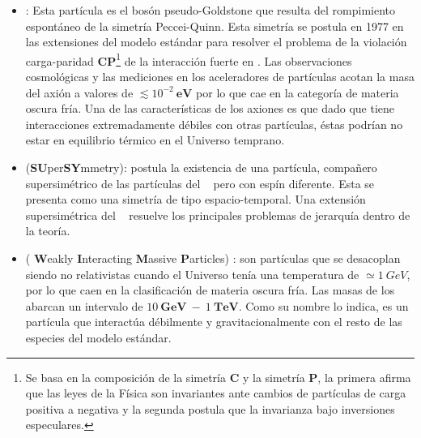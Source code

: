 \begin{itemize}
\item \textbf{\Axiones}%
: Esta partícula es el bosón pseudo-Goldstone que resulta del rompimiento espontáneo de la simetría Peccei-Quinn. Esta simetría se postula en 1977 en las extensiones del modelo estándar para resolver el problema de la violación carga-paridad \textbf{CP}\footnote{Se basa en la composición de la simetría \textbf{C} y la simetría \textbf{P}, la primera afirma que las leyes de la Física son invariantes  ante cambios de partículas de carga positiva a negativa y la segunda postula que la invarianza bajo inversiones especulares. } de la interacción fuerte en \QCD. Las observaciones cosmológicas y las mediciones en los aceleradores de partículas acotan la masa del axión a valores de $\lesssim 10^{-2}~\mathbf{eV}$ por lo que cae en la categoría de materia oscura fría. Una de las características de los axiones es que dado que tiene interacciones extremadamente débiles con otras partículas, éstas podrían no estar en equilibrio térmico en el Universo temprano. 

\item  \SUSY (\textbf{SU}per\textbf{SY}mmetry): postula la existencia de una partícula, compañero supersimétrico de las partículas del \ME ~ pero con espín diferente. Esta se presenta como una simetría de tipo espacio-temporal. Una extensión supersimétrica del \ME ~ resuelve los principales problemas de jerarquía dentro de la teoría.

\item \WIMPs ( \textbf{W}eakly \textbf{I}nteracting \textbf{M}assive \textbf{P}articles) %
: son partículas que se desacoplan siendo no relativistas cuando el Universo tenía una temperatura de $\simeq 1~ GeV$, por lo que caen en la clasificación de materia oscura fría. Las masas
de los \WIMPs ~ abarcan un intervalo de $10 ~ \mathbf{GeV} ~ - ~ 1 ~ \mathbf{TeV}$. Como su nombre lo indica, es un partícula que interactúa débilmente y gravitacionalmente con el resto de las especies del modelo estándar. 




\end{itemize}
